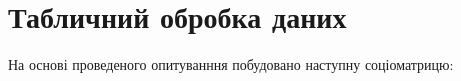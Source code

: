 \chapter{Табличний обробка даних}

На основі проведеного опитуванння побудовано наступну соціоматрицю:


